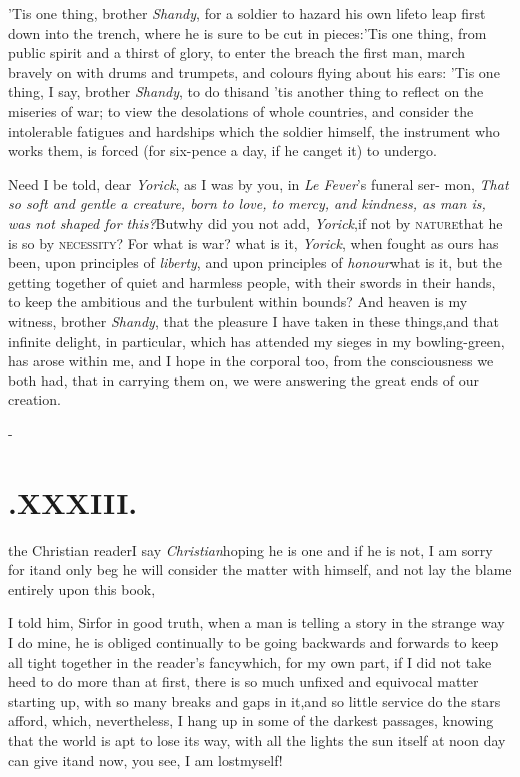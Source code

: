 \documentclass{article}
\begin{document}
\tsh ’Tis one thing, brother \textit{Shandy},\break
for a soldier to hazard his own life\tsk to leap first down into the trench, where
he is sure to be cut in pieces:\tsh ’Tis one thing, from public spirit and a thirst
of glory, to enter the breach the first man,\break{}
march bravely on with drums and trumpets, and colours flying about his ears:\break
\tsh ’Tis one thing, I say, brother \textit{Shandy}, to do this\tsk and ’tis another
thing to reflect on the miseries of war;\break
\tsk to view the desolations of whole
countries, and consider the intolerable fatigues and hardships which the soldier
himself, the instrument who works them, is forced (for six-pence a day,
if he can\break get it) to undergo.

Need I be told, dear \textit{Yorick}, as I was by you, in \textit{Le
Fever}’s funeral ser- mon, \textit{That so soft and gentle a
creature, born to love, to mercy, and kindness, as man is, was not
shaped for this?}\tsh But\break why did you not add,
\textit{Yorick},\tsk if not by \textsc{nature}\tsk that he
is so by \textsc{necessity}?\break
\tsk For what is war? what is it, \textit{Yorick},\break
when fought as ours has been, upon
principles of \textit{liberty}, and upon principles of
\textit{honour}\tsk what is it, but the getting together of quiet
and harmless people, with their swords in their hands, to keep the
ambitious and the turbulent within bounds? And heaven is my
witness, brother \textit{Shandy}, that the pleasure I have taken in
these things,\tsk and that infinite delight, in particular, which
has attended my sieges in my bowling-green, has arose within me,
and I hope in the corporal too, from the consciousness we both had,
that in carrying them on, we were answering the great ends of our\break
creation.

\vfill{}\eject
\null\kern-\baselineskip
\section{.\enspace XXXIII.}

 the Christian reader\tsk I
say\break
\textit{Christian}\tsh hoping he is one\tsh\break
and if he is not, I am sorry for it\tsh and only beg he will consider the matter
with himself, and not lay the blame entirely upon this book,\tsh

I told him, Sir\tsh for in good truth, when a man is
telling a story in the strange way I do mine, he is obliged
continually to be going backwards and forwards to keep all tight
together in the reader’s fancy\tsh which, for my own
part, if I did not take heed to do more than at first, there is so
much unfixed and equivocal matter starting up, with so many breaks
and gaps in it,\tsk and so little service do the stars afford,
which, nevertheless, I hang up in some of the darkest passages,
knowing that the world is apt to lose its way, with all the lights
the sun itself at noon day can give it\tsh and now, you see, I am lost\break myself!\tsh
\end{document}
